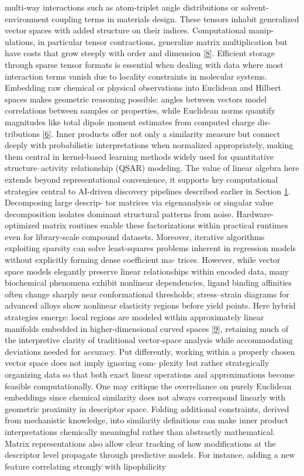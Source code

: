 \documentclass[
]{article}
\begin{document}
multi-way interactions such as atom-triplet angle distributions or
solvent-environment coupling terms in materials design. These tensors
inhabit generalized vector spaces with added structure on their indices.
Computational manip- ulations, in particular tensor contractions,
generalize matrix multiplication but have costs that grow steeply with
order and dimension {[}\protect\hyperlink{_bookmark48}{8}{]}. Efficient
storage through sparse tensor formats is essential when dealing with
data where most interaction terms vanish due to locality constraints in
molecular systems. Embedding raw chemical or physical observations into
Euclidean and Hilbert spaces makes geometric reasoning possible: angles
between vectors model correlations between samples or properties, while
Euclidean norms quantify magnitudes like total dipole moment estimates
from computed charge dis- tributions
{[}\protect\hyperlink{_bookmark46}{6}{]}. Inner products offer not only
a similarity measure but connect deeply with probabilistic
interpretations when normalized appropriately, making them central in
kernel-based learning methods widely used for quantitative
structure--activity relationship (QSAR) modeling. The value of linear
algebra here extends beyond representational convenience, it supports
key computational strategies central to AI-driven discovery pipelines
described earlier in Section \protect\hyperlink{introduction}{1}.
Decomposing large descrip- tor matrices via eigenanalysis or singular
value decomposition isolates dominant structural patterns from noise.
Hardware-optimized matrix routines enable these factorizations within
practical runtimes even for library-scale compound datasets. Moreover,
iterative algorithms exploiting sparsity can solve least-squares
problems inherent in regression models without explicitly forming dense
coefficient ma- trices. However, while vector space models elegantly
preserve linear relationships within encoded data, many biochemical
phenomena exhibit nonlinear dependencies, ligand binding affinities
often change sharply near conformational thresholds; stress--strain
diagrams for advanced alloys show nonlinear elasticity regions before
yield points. Here hybrid strategies emerge: local regions are modeled
within approximately linear manifolds embedded in higher-dimensional
curved spaces {[}\protect\hyperlink{_bookmark49}{9}{]}, retaining much
of the interpretive clarity of traditional vector-space analysis while
accommodating deviations needed for accuracy. Put differently, working
within a properly chosen vector space does not imply ignoring com-
plexity but rather strategically organizing data so that both exact
linear operations and approximations become feasible computationally.
One may critique the overreliance on purely Euclidean embeddings since
chemical similarity does not always correspond linearly with geometric
proximity in descriptor space. Folding additional constraints, derived
from mechanistic knowledge, into similarity definitions can make inner
product interpretations chemically meaningful rather than abstractly
mathematical. Matrix representations also allow clear tracking of how
modifications at the descriptor level propagate through predictive
models. For instance, adding a new feature correlating strongly with
lipophilicity
\end{document}
